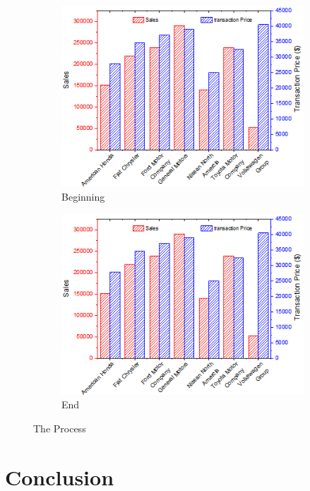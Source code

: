\documentclass{proc}
\begin{document}
\begin{figure}[htbp]
    \centering
    \begin{subfigure}[b]{0.2\textwidth}
        \centering
        \includegraphics[scale=.2]{DoubleY_Column.png}
        \caption{Beginning}
        \label{graph}
    \end{subfigure}%

    \begin{subfigure}[b]{0.2\textwidth}
        \centering
        \includegraphics[scale=.2]{DoubleY_Column.png}
        \caption{End}
        \label{graph2}
    \end{subfigure}%

    \caption{The Process}
    \label{subs}
\end{figure}

\subsection{}


\section{Conclusion}
\end{document}
